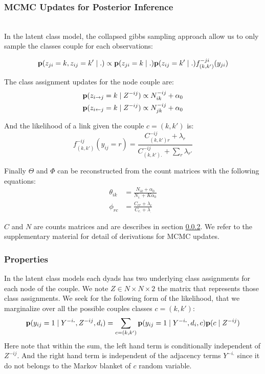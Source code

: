 \documentclass[a4paper, 12pt]{article}
\begin{document}
\subsubsection{MCMC Updates for Posterior Inference}~\\

In the latent class model, the collapsed gibbs sampling approach allow us to only sample the classes couple for each observations:

\begin{equation}
\mathbf{p}(z_{ji}=k, z_{ij}=k' \mid .) \propto \mathbf{p}(z_{ji}=k \mid .) \mathbf{p}(z_{ij}=k' \mid .) f_{(k,k')}^{-ji}(y_{ji})
\end{equation}


The class assignment updates for the node couple are:
\begin{align}
\mathbf{p}(z_{i\rightarrow j} =k \mid Z^{-ij}) &\propto N_{ik}^{-ij} + \alpha_0 \\
\mathbf{p}(z_{i\leftarrow j} =k \mid Z^{-ij}) &\propto N_{jk}^{-ij} + \alpha_0 
\end{align}

And the likelihood of a link given the couple $c=(k, k')$ is:
\begin{equation} \label{eq:cgs_mmsb}
f_{(k, k')}^{-ij}(y_{ij}=r) = \frac{C_{(k,k')r}^{-ij} + \lambda_r}{C_{(k,k')\bm{.}}^{-ij} + \sum_r\lambda_{r'}} 
\end{equation}

Finally $\Theta$ and $\Phi$ can be reconstructed from the count matrices with the following equations:
\begin{align}
\theta_{ik} &= \frac{N_{ik} + \alpha_0}{ N_{i\bm{.}} + K\alpha_0} \\
\phi_{rc} &= \frac{C_{cr} + \lambda_r}{ C_{c.} + \lambda_{\bm{.}}}
\end{align}

$C$ and $N$ are counts matrices and are describes in section \ref{burst_class}. We refer to the supplementary material for detail of derivations for MCMC updates. 

\subsubsection{Properties}

\label{burst_class}

In the latent class models each  dyads has two underlying  class assignments for each node of the couple. We note $Z \in N\times N\times 2$ the matrix that represents those class assignments.
We seek for the following form of the likelihood, that we marginalize over all the possible couples classes $c=(k, k')$:
\begin{equation} \label{eq:q}
\mathbf{p}(y_{ij}=1 \mid Y^{-i\bm{.}}, Z^{-ij}, d_i ) = \sum_{c=(k, k')} \mathbf{p}(y_{ij}=1 \mid Y^{-i\bm{.}}, d_i , c) \mathbf{p}(c \mid  Z^{-ij} ) 
\end{equation}
Here note that within the sum, the left hand term is conditionally independent of $Z^{-ij}$. And the right hand term is independent of the adjacency terms $Y^{-i\bm{.}}$ since it do not belongs to the Markov blanket of $c$ random variable.
\end{document}
